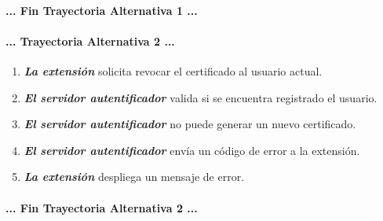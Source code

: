 \documentclass[12pt, a4paper, titlepage]{report}
\begin{document}
    		\paragraph{... Fin Trayectoria Alternativa 1 ...}
    		
    		\paragraph{... Trayectoria Alternativa 2 ...}
    		\begin{enumerate}
    		    \item \textbf{\textit{La extensión}} solicita revocar el certificado al usuario actual.
                
                \item \textbf{\textit{El servidor autentificador}} valida si se encuentra registrado el usuario.
                
    		    \item \textbf{\textit{El servidor autentificador}} no puede generar un nuevo certificado.
    		     
    		    \item \textbf{\textit{El servidor autentificador}} envía un código de error a la extensión.
    		    
    		    \item \textbf{\textit{La extensión}} despliega un mensaje de error.
    		\end{enumerate}
    		\paragraph{... Fin Trayectoria Alternativa 2 ...}
    		
\end{document}

